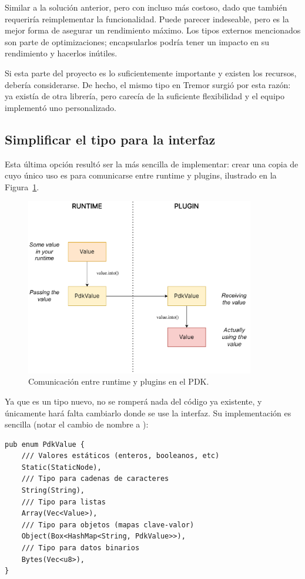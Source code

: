 Similar a la solución anterior, pero con incluso más costoso, dado que también
requeriría reimplementar la funcionalidad. Puede parecer indeseable, pero es la
mejor forma de asegurar un rendimiento máximo. Los tipos externos mencionados
son parte de optimizaciones; encapsularlos podría tener un impacto en su
rendimiento y hacerlos inútiles.

Si esta parte del proyecto es lo suficientemente importante y existen los
recursos, debería considerarse. De hecho, el mismo tipo  en Tremor
surgió por esta razón: ya existía  de otra librería, pero
carecía de la suficiente flexibilidad y el equipo implementó uno personalizado.

\subsection{Simplificar el tipo para la interfaz}

Esta última opción resultó ser la más sencilla de implementar: crear una copia
de  cuyo único uso es para comunicarse entre runtime y plugins,
ilustrado en la Figura~\ref{fig:simplify}.

\begin{figure}
    \centering
    \includegraphics[width=10cm]{./Imagenes/simplify.pdf}
    \caption{Comunicación entre runtime y plugins en el PDK.}%
    \label{fig:simplify}
\end{figure}

Ya que es un tipo nuevo, no se romperá nada del código ya existente, y
únicamente hará falta cambiarlo donde se use la interfaz. Su implementación es
sencilla (notar el cambio de nombre a ):

\begin{verbatim}
pub enum PdkValue {
    /// Valores estáticos (enteros, booleanos, etc)
    Static(StaticNode),
    /// Tipo para cadenas de caracteres
    String(String),
    /// Tipo para listas
    Array(Vec<Value>),
    /// Tipo para objetos (mapas clave-valor)
    Object(Box<HashMap<String, PdkValue>>),
    /// Tipo para datos binarios
    Bytes(Vec<u8>),
}
\end{verbatim}

